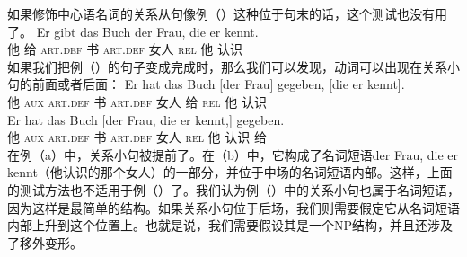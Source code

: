 \noindent
如果修饰中心语名词的关系从句像例（）这种位于句末的话，这个测试也没有用了。
\ea
\gll Er gibt das Buch der Frau, die er kennt.\\
      他 给 \textsc{art}.\textsc{def} 书 \textsc{art}.\textsc{def} 女人 \textsc{rel} 他 认识\\
\z
如果我们把例（）的句子变成完成时，那么我们可以发现，动词可以出现在关系小句的前面或者后面：
\eal
\ex 
\gll Er hat das Buch [der Frau] gegeben, [die er kennt].\\
     他 \textsc{aux} \textsc{art}.\textsc{def} 书 \spacebr{}\textsc{art}.\textsc{def} 女人 给 \spacebr{}\textsc{rel} 他 认识\\
\ex 
\gll Er hat das Buch [der Frau, die er kennt,] gegeben.\\
	 他 \textsc{aux} \textsc{art}.\textsc{def} 书 \spacebr{}\textsc{art}.\textsc{def} 女人 \textsc{rel} 他 认识 给\\
\zl
在例（a）中，关系小句被提前了。在（b）中，它构成了名词短语der Frau, die er kennt（他认识的那个女人）的一部分，并位于中场的名词短语内部。这样，上面的测试方法也不适用于例（）了。我们认为例（）中的关系小句也属于名词短语，因为这样是最简单的结构。如果关系小句位于后场，我们则需要假定它从名词短语内部上升到这个位置上。也就是说，我们需要假设其是一个NP结构，并且还涉及了移外变形。
%
